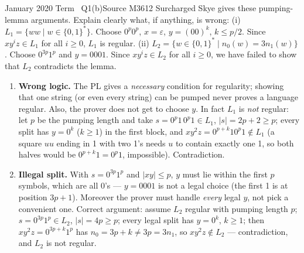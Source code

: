 \documentclass[11pt,a4paper]{article}
\newcommand{\eps}{\varepsilon}
\begin{document}
\begin{question}{January 2020 Term \textbullet\ Q1(b)}{Source M36}{12}
Surcharged Skye gives these pumping-lemma arguments. Explain clearly what, if anything, is wrong:
(i) $L_1=\{ww\mid w\in\{0,1\}^*\}$. Choose $0^p0^p$, $x=\eps$, $y=(00)^k$, $k\le p/2$. Since $xy^iz\in L_1$ for all $i\ge0$, $L_1$ is regular.
(ii) $L_2=\{w\in\{0,1\}^*\mid n_0(w)=3n_1(w)\}$. Choose $0^{3p}1^p$ and $y=0001$. Since $xy^iz\in L_2$ for all $i\ge0$, we have failed to show that $L_2$ contradicts the lemma.
\end{question}
\begin{solution}
\begin{enumerate}
\item \textbf{Wrong logic.} The PL gives a \emph{necessary} condition for regularity; showing that one string (or even every string) can be pumped never proves a language regular. Also, the prover does not get to choose $y$. In fact $L_1$ is \emph{not} regular: let $p$ be the pumping length and take $s=0^p1\,0^p1\in L_1$, $|s|=2p+2\ge p$; every split has $y=0^k$ ($k\ge1$) in the first block, and $xy^2z=0^{p+k}10^p1\notin L_1$ (a square $uu$ ending in 1 with two 1's needs $u$ to contain exactly one 1, so both halves would be $0^{p+k}1=0^p1$, impossible). Contradiction.
\item \textbf{Illegal split.} With $s=0^{3p}1^p$ and $|xy|\le p$, $y$ must lie within the first $p$ symbols, which are all 0's --- $y=0001$ is not a legal choice (the first 1 is at position $3p+1$). Moreover the prover must handle \emph{every} legal $y$, not pick a convenient one. Correct argument: assume $L_2$ regular with pumping length $p$; $s=0^{3p}1^p\in L_2$, $|s|=4p\ge p$; every legal split has $y=0^k$, $k\ge1$; then $xy^2z=0^{3p+k}1^p$ has $n_0=3p+k\neq3p=3n_1$, so $xy^2z\notin L_2$ --- contradiction, and $L_2$ is not regular.
\end{enumerate}
\end{solution}
\end{document}
